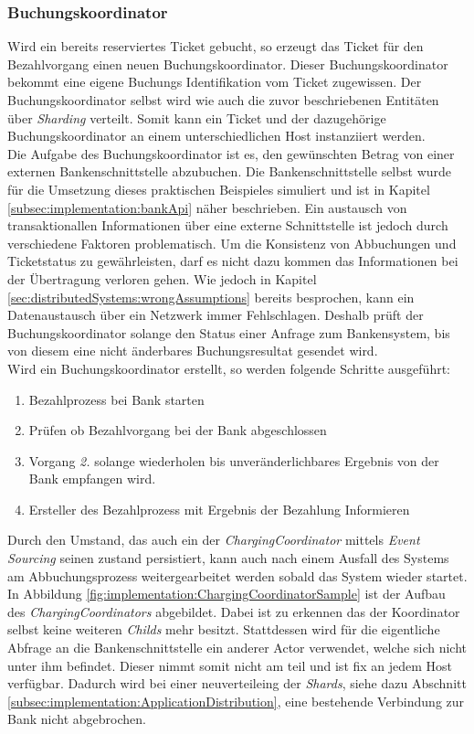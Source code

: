 \subsubsection{Buchungskoordinator}
Wird ein bereits reserviertes Ticket gebucht, so erzeugt das Ticket für den Bezahlvorgang einen neuen Buchungskoordinator. Dieser Buchungskoordinator bekommt eine eigene Buchungs Identifikation vom Ticket zugewissen. Der Buchungskoordinator selbst wird wie auch die zuvor beschriebenen Entitäten über \textit{Sharding} verteilt. Somit kann ein Ticket und der dazugehörige Buchungskoordinator an einem unterschiedlichen Host instanziiert werden. \\
Die Aufgabe des Buchungskoordinator ist es, den gewünschten Betrag von einer externen Bankenschnittstelle abzubuchen. Die Bankenschnittstelle selbst wurde für die Umsetzung dieses praktischen Beispieles simuliert und ist in Kapitel \ref{subsec:implementation:bankApi} näher beschrieben. Ein austausch von transaktionallen Informationen über eine externe Schnittstelle ist jedoch durch verschiedene Faktoren problematisch. Um die Konsistenz von Abbuchungen und Ticketstatus zu gewährleisten, darf es nicht dazu kommen das Informationen bei der Übertragung verloren gehen. Wie jedoch in Kapitel \ref{sec:distributedSystems:wrongAssumptions} bereits besprochen, kann ein Datenaustausch über ein Netzwerk immer Fehlschlagen. Deshalb prüft der Buchungskoordinator solange den Status einer Anfrage zum Bankensystem, bis von diesem eine nicht änderbares Buchungsresultat gesendet wird. \\
Wird ein Buchungskoordinator erstellt, so werden folgende Schritte ausgeführt:
\begin{enumerate}
    \item Bezahlprozess bei Bank starten
    \item Prüfen ob Bezahlvorgang bei der Bank abgeschlossen
    \item Vorgang \textit{2.} solange wiederholen bis unveränderlichbares Ergebnis von der Bank empfangen wird.
    \item Ersteller des Bezahlprozess mit Ergebnis der Bezahlung Informieren
\end{enumerate}
Durch den Umstand, das auch ein der \textit{ChargingCoordinator} mittels \textit{Event Sourcing} seinen zustand persistiert, kann auch nach einem Ausfall des Systems am Abbuchungsprozess weitergearbeitet werden sobald das System wieder startet. \\
In Abbildung \ref{fig:implementation:ChargingCoordinatorSample} ist der Aufbau des \textit{ChargingCoordinators} abgebildet. Dabei ist zu erkennen das der Koordinator selbst keine weiteren \textit{Childs} mehr besitzt. Stattdessen wird für die eigentliche Abfrage an die Bankenschnittstelle ein anderer Actor verwendet, welche sich nicht unter ihm befindet. Dieser nimmt somit nicht am  teil und ist fix an jedem Host verfügbar. Dadurch wird bei einer neuverteileing der \textit{Shards}, siehe dazu Abschnitt \ref{subsec:implementation:ApplicationDistribution}, eine bestehende Verbindung zur Bank nicht abgebrochen. 
